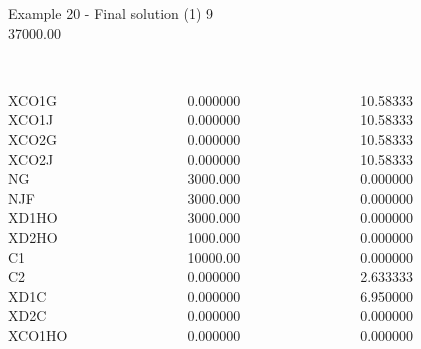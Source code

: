 \begin{frame}{Example 20 - Final solution (1)}
\footnotesize
{}  9\\
  37000.00\\

\begin{columns}[t]
\begin{column}{0.3\textwidth}
\\
XCO1G\\
XCO1J\\
XCO2G\\
XCO2J\\
NG\\
NJF\\
XD1HO\\
XD2HO\\
C1\\
C2\\
XD1C\\
XD2C\\
XCO1HO\\
\end{column}

\begin{column}{0.3\textwidth}
\\
0.000000\\
0.000000\\
0.000000\\
0.000000\\
3000.000\\
3000.000\\
3000.000\\
1000.000\\
10000.00\\
0.000000\\
0.000000\\
0.000000\\
0.000000\\
\end{column}

\begin{column}{0.3\textwidth}
\\
10.58333\\
10.58333\\
10.58333\\
10.58333\\
0.000000\\
0.000000\\
0.000000\\
0.000000\\
0.000000\\
2.633333\\
6.950000\\
0.000000\\
0.000000\\
\end{column}
\end{columns}

\end{frame}


